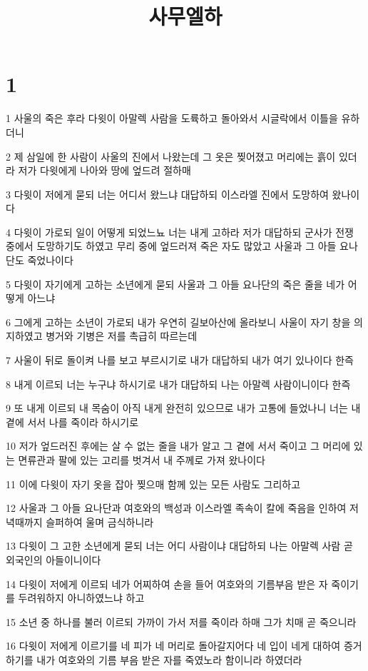 

\title{사무엘하}


\chapter{1}

\par 1 사울의 죽은 후라 다윗이 아말렉 사람을 도륙하고 돌아와서 시글락에서 이틀을 유하더니
\par 2 제 삼일에 한 사람이 사울의 진에서 나왔는데 그 옷은 찢어졌고 머리에는 흙이 있더라 저가 다윗에게 나아와 땅에 엎드려 절하매
\par 3 다윗이 저에게 묻되 너는 어디서 왔느냐 대답하되 이스라엘 진에서 도망하여 왔나이다
\par 4 다윗이 가로되 일이 어떻게 되었느뇨 너는 내게 고하라 저가 대답하되 군사가 전쟁 중에서 도망하기도 하였고 무리 중에 엎드러져 죽은 자도 많았고 사울과 그 아들 요나단도 죽었나이다
\par 5 다윗이 자기에게 고하는 소년에게 묻되 사울과 그 아들 요나단의 죽은 줄을 네가 어떻게 아느냐
\par 6 그에게 고하는 소년이 가로되 내가 우연히 길보아산에 올라보니 사울이 자기 창을 의지하였고 병거와 기병은 저를 촉급히 따르는데
\par 7 사울이 뒤로 돌이켜 나를 보고 부르시기로 내가 대답하되 내가 여기 있나이다 한즉
\par 8 내게 이르되 너는 누구냐 하시기로 내가 대답하되 나는 아말렉 사람이니이다 한즉
\par 9 또 내게 이르되 내 목숨이 아직 내게 완전히 있으므로 내가 고통에 들었나니 너는 내 곁에 서서 나를 죽이라 하시기로
\par 10 저가 엎드러진 후에는 살 수 없는 줄을 내가 알고 그 곁에 서서 죽이고 그 머리에 있는 면류관과 팔에 있는 고리를 벗겨서 내 주께로 가져 왔나이다
\par 11 이에 다윗이 자기 옷을 잡아 찢으매 함께 있는 모든 사람도 그리하고
\par 12 사울과 그 아들 요나단과 여호와의 백성과 이스라엘 족속이 칼에 죽음을 인하여 저녁때까지 슬퍼하여 울며 금식하니라
\par 13 다윗이 그 고한 소년에게 묻되 너는 어디 사람이냐 대답하되 나는 아말렉 사람 곧 외국인의 아들이니이다
\par 14 다윗이 저에게 이르되 네가 어찌하여 손을 들어 여호와의 기름부음 받은 자 죽이기를 두려워하지 아니하였느냐 하고
\par 15 소년 중 하나를 불러 이르되 가까이 가서 저를 죽이라 하매 그가 치매 곧 죽으니라
\par 16 다윗이 저에게 이르기를 네 피가 네 머리로 돌아갈지어다 네 입이 네게 대하여 증거하기를 내가 여호와의 기름 부음 받은 자를 죽였노라 함이니라 하였더라
